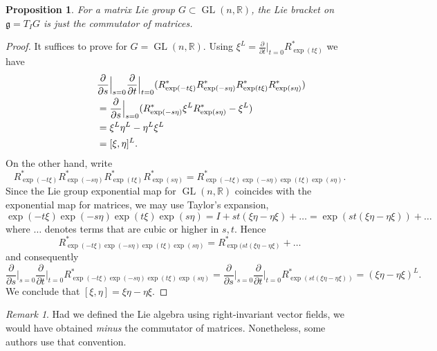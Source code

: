 \documentclass{article}
\newtheorem{proposition}[theorem]{Proposition}
\theoremstyle{remark}
\newtheorem{remark}[theorem]{Remark}
\newcommand{\R}{\mathbb{R}}
\newcommand\lie[1]{\mathfrak{#1}}
\newcommand{\g}{\lie{g}}
\newcommand{\on}{\operatorname}
\newcommand{\GL}{ \on{GL}}
\newcommand{\f}{\frac}
\newcommand{\p}{\partial}
\begin{document}
\begin{proposition}
For a matrix Lie group $G\subset \GL(n,\R)$, the Lie bracket on $\g=T_IG$ is just the commutator of matrices.
\end{proposition}
\begin{proof}
It suffices to prove for $G=\GL(n,\R)$. Using 
$\xi^L=\f{\p}{\p t}\Big|_{t=0} R_{\exp(t\xi)}^*$
we have
\[ \begin{split}
\lefteqn{\f{\p}{\p s}\Big|_{s=0}\f{\p}{\p t}\Big|_{t=0} 
(R_{\exp(-t\xi)}^*R_{\exp(-s\eta)}^* 
R_{\exp(t\xi)}^* R_{\exp(s\eta)}^*)}\\
&=\f{\p}{\p s}\Big|_{s=0}(R_{\exp(-s\eta)}^* \xi^L R_{\exp(s\eta)}^*-\xi^L)\\
&= \xi^L\eta^L-\eta^L\xi^L\\
&=[\xi,\eta]^L.
\end{split}\]
On the other hand, write 
\[ R_{\exp(-t\xi)}^*R_{\exp(-s\eta)}^* 
R_{\exp(t\xi)}^* R_{\exp(s\eta)}^*
=R_{\exp(-t\xi)\exp(-s\eta)\exp(t\xi)\exp(s\eta)}^*.\]
Since the Lie group exponential map for $\GL(n,\R)$ coincides with the 
exponential map for matrices, we may use Taylor's expansion, 
\[\exp(-t\xi)\exp(-s\eta)\exp(t\xi)\exp(s\eta)=I+st(\xi\eta-\eta\xi)+\ldots
=\exp(st(\xi\eta-\eta\xi))+\ldots
\]
where $\ldots$ denotes terms that are cubic or higher in $s,t$. 
Hence 
\[ R_{\exp(-t\xi)\exp(-s\eta)\exp(t\xi)\exp(s\eta)}^*=R_{\exp(st (\xi\eta-\eta\xi)}^*+\ldots\]
and consequently
\[ \f{\p}{\p s}\Big|_{s=0}\f{\p}{\p t}\Big|_{t=0} R_{\exp(-t\xi)\exp(-s\eta)\exp(t\xi)\exp(s\eta)}^*
=\f{\p}{\p s}\Big|_{s=0}\f{\p}{\p t}\Big|_{t=0} R_{\exp(st (\xi\eta-\eta\xi))}^*
=(\xi\eta-\eta\xi)^L.\]
We conclude that $[\xi,\eta]=\xi\eta-\eta\xi$. 
\end{proof}

\begin{remark}
Had we defined the Lie algebra using right-invariant vector fields, we would have 
obtained \emph{minus} the commutator of matrices. Nonetheless, some authors use that convention. 
\end{remark}
\end{document}
